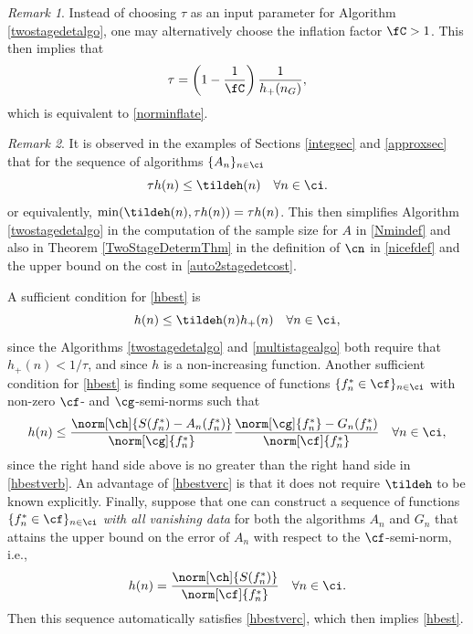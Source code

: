 \documentclass[]{elsarticle}
\theoremstyle{definition}
\theoremstyle{remark}
\newtheorem{rem}{Remark}
\begin{document}
\begin{rem} Instead of choosing $\tau$ as an input parameter for Algorithm \ref{twostagedetalgo}, one may alternatively choose the inflation factor $\fC >1$.  This then implies that 
\begin{equation} \label{taufromnC}
\tau = \left(1 - \frac{1}{\fC}\right)\frac{1}{h_{+}(n_G)},
\end{equation}
which is equivalent to \eqref{norminflate}.
\end{rem}

\begin{rem} It is observed in the examples of Sections \ref{integsec} and \ref{approxsec} that for the sequence of algorithms $\{A_n\}_{n \in \ci}$
\begin{equation} \label{hbest}
\tau h(n) \le \tildeh(n) \quad \forall n \in \ci.
\end{equation}
or equivalently, $\min(\tildeh(n),\tau h(n))=\tau h(n)$.  This then simplifies Algorithm \ref{twostagedetalgo} in the computation of the sample size for $A$ in \eqref{Nmindef} and also in Theorem \ref{TwoStageDetermThm} in the definition of $\cn$ in \eqref{nicefdef} and the upper bound on the cost in \eqref{auto2stagedetcost}. 

A sufficient condition for \eqref{hbest} is
\begin{equation} \label{hbestverb}
h(n) \le \tildeh(n) h_{+}(n) \quad \forall n \in \ci,
\end{equation}
since the Algorithms \ref{twostagedetalgo} and \ref{multistagealgo} both require that $h_{+}(n) < 1/\tau$, and since $h$ is a non-increasing function.   Another 
sufficient condition for \eqref{hbest} is finding some sequence of functions $\{f^*_n \in \cf\}_{n \in \ci}$ with non-zero $\cf$- and $\cg$-semi-norms such that 
\begin{equation} \label{hbestverc}
h(n) \le \frac{\norm[\ch]{S(f^*_n)-A_n(f_n^*)}}{\norm[\cg]{f_n^*}} \frac{\norm[\cg]{f^*_n}-G_n(f^*_n)}{\norm[\cf]{f^*_n}}   \quad \forall n \in \ci,
\end{equation}
since the right hand side above is no greater than the right hand side in \eqref{hbestverb}. An advantage of \eqref{hbestverc} is that it does not require $\tildeh$ to be known explicitly. Finally, suppose that one can construct a sequence of functions $\{f^*_n \in \cf\}_{n \in \ci}$ \emph{with all vanishing data} for both the algorithms $A_n$ and $G_n$ that attains the upper bound on the error of $A_n$ with respect to the $\cf$-semi-norm, i.e.,
\begin{equation} \label{hbestverd}
h(n) = \frac{\norm[\ch]{S(f^*_n)}}{\norm[\cf]{f^*_n}}   \quad \forall n \in \ci.
\end{equation}
Then this sequence automatically satisfies \eqref{hbestverc}, which then implies \eqref{hbest}.
\end{rem}
\end{document}
